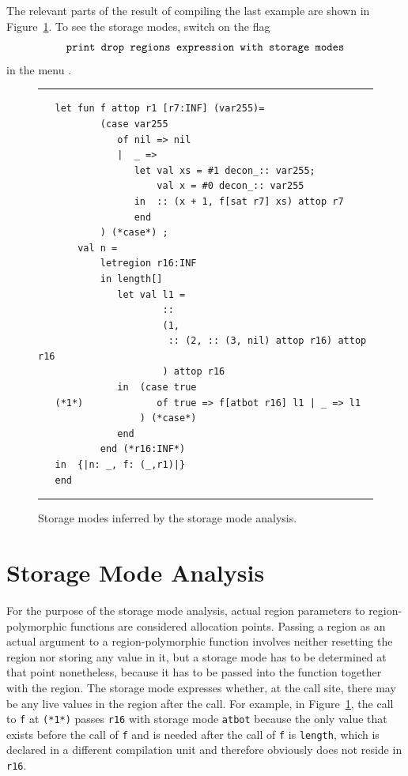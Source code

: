 \documentclass[12pt]{book}
\begin{document}
The relevant parts of the result of compiling the last example are
shown in Figure~\ref{sma1.fig}.  To see the storage modes, switch on
the flag
%
$$\hbox{\tt print drop regions expression with storage modes}$$
in the menu .


\begin{figure}
\hrule 
\medskip
\begin{verbatim}
   let fun f attop r1 [r7:INF] (var255)= 
           (case var255 
              of nil => nil
              |  _ => 
                 let val xs = #1 decon_:: var255; 
                     val x = #0 decon_:: var255
                 in  :: (x + 1, f[sat r7] xs) attop r7
                 end 
           ) (*case*) ; 
       val n = 
           letregion r16:INF 
           in length[] 
              let val l1 = 
                      :: 
                      (1, 
                       :: (2, :: (3, nil) attop r16) attop r16
                      ) attop r16
              in  (case true 
   (*1*)             of true => f[atbot r16] l1 | _ => l1
                  ) (*case*) 
              end  
           end (*r16:INF*)
   in  {|n: _, f: (_,r1)|}
   end 
\end{verbatim}
\caption{Storage modes inferred by the storage mode analysis.}
\label{sma1.fig}
\medskip
\hrule
\end{figure}

\section{Storage Mode Analysis}
\label{sma.sec}
For the purpose of the storage mode analysis, actual region parameters
to region-polymorphic functions are considered allocation points.
Passing a region as an actual argument to a region-polymorphic
function involves neither resetting the region nor storing any value
in it, but a storage mode has to be determined at that point
nonetheless, because it has to be passed into the function together
with the region. The storage mode expresses whether, at the call site,
there may be any live values in the region after the call. For
example, in Figure~\ref{sma1.fig}, the call to {\tt f} at {\tt (*1*)}
passes {\tt r16} with storage mode {\tt atbot} because the only value
that exists before the call of {\tt f} and is needed after the call of
{\tt f} is {\tt length}, which is declared in a different compilation
unit and therefore obviously does not reside in {\tt r16}.
\end{document}
